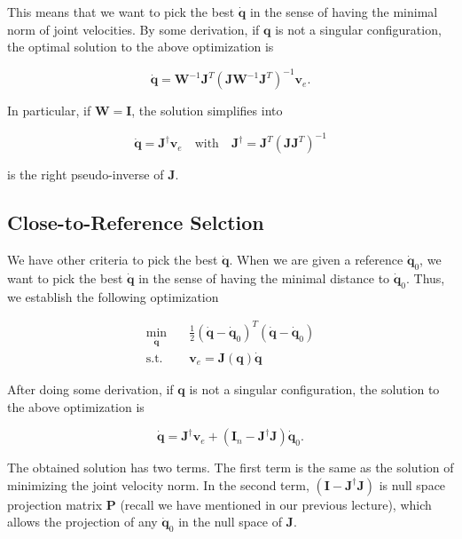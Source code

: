 \documentclass[10pt]{article}
\begin{document}
This means that we want to pick the best $\dot{\boldsymbol{q}}$ in the sense of having the minimal norm of joint velocities.
By some derivation, if  $\boldsymbol{q}$ is not a singular configuration, the optimal solution to the above optimization is

$$
\dot{\boldsymbol{q}}=\boldsymbol{W}^{-1} \boldsymbol{J}^{T}\left(\boldsymbol{J} \boldsymbol{W}^{-1} \boldsymbol{J}^{T}\right)^{-1} \boldsymbol{v}_{e} .
$$



In particular, if $\boldsymbol{W}=\boldsymbol{I}$, the solution simplifies into

$$
\dot{\boldsymbol{q}}=\boldsymbol{J}^{\dagger} \boldsymbol{v}_{e} \quad \text{with} \quad \boldsymbol{J}^{\dagger}=\boldsymbol{J}^{T}\left(\boldsymbol{J} \boldsymbol{J}^{T}\right)^{-1}
$$


is the right pseudo-inverse of $\boldsymbol{J}$.

\subsection{Close-to-Reference Selction}

We have other criteria to pick the best $\dot{\boldsymbol{q}}$. When we are given a reference $\dot{\boldsymbol{q}}_{0}$, we want to pick the best  $\dot{\boldsymbol{q}}$ in the sense of having the minimal distance to  $\dot{\boldsymbol{q}}_{0}$. Thus, we establish the following optimization

$$
    \begin{aligned}
        \min_{\dot{\boldsymbol{q}}} \quad &
        \frac{1}{2}\left(\dot{\boldsymbol{q}}-\dot{\boldsymbol{q}}_{0}\right)^{T}\left(\dot{\boldsymbol{q}}-\dot{\boldsymbol{q}}_{0}\right)\\
        \text{s.t.}\quad & \boldsymbol{v}_{e}  =\boldsymbol{J}(\boldsymbol{q}) \dot{\boldsymbol{q}}
    \end{aligned}
    $$

After doing some derivation,  if $\boldsymbol{q}$ is not a singular configuration, the solution to the above optimization is

$$
\dot{\boldsymbol{q}}=\boldsymbol{J}^{\dagger} \boldsymbol{v}_{e}+\left(\boldsymbol{I}_{n}-\boldsymbol{J}^{\dagger} \boldsymbol{J}\right) \dot{\boldsymbol{q}}_{0} .
$$

The obtained solution has two terms. The first term is the same as the solution of minimizing the joint velocity norm. In the second term,   $\left(\boldsymbol{I}-\boldsymbol{J}^{\dagger} \boldsymbol{J}\right)$ is null space projection matrix $\boldsymbol{P}$ (recall we have mentioned in our previous lecture), which allows the projection of any  $\dot{\boldsymbol{q}}_{0}$ in the null space of $\boldsymbol{J}$.
\end{document}
